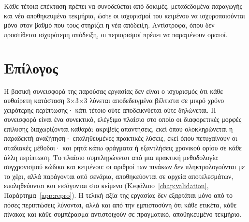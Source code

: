 Κάθε τέτοια επέκταση πρέπει να συνοδεύεται από δοκιμές, μεταδεδομένα παραγωγής και νέα αποθηκευμένα τεκμήρια, ώστε οι ισχυρισμοί του κειμένου να ισχυροποιούνται μόνο στον βαθμό που τους στηρίζει η νέα απόδειξη. Αντίστροφα, όπου δεν προστίθεται ισχυρότερη απόδειξη, οι περιορισμοί πρέπει να παραμένουν ορατοί.

\section{Επίλογος}
\label{sec:conclusions-epilogue}

Η βασική συνεισφορά της παρούσας εργασίας δεν είναι ο ισχυρισμός ότι κάθε αυθαίρετη κατάσταση 3×3×3 λύνεται αποδεδειγμένα βέλτιστα σε μικρό χρόνο χειρότερης περίπτωσης· κάτι τέτοιο ούτε αποδεικνύεται ούτε δηλώνεται. Η συνεισφορά είναι ένα συνεκτικό, ελέγξιμο πλαίσιο στο οποίο οι διαφορετικές μορφές επίλυσης διαχωρίζονται καθαρά: ακριβείς απαντήσεις, εκεί όπου ολοκληρώνεται η παραδεκτή αναζήτηση· επαληθευμένες πρακτικές λύσεις, εκεί όπου πετυχαίνουν οι σταδιακές μέθοδοι· και ρητά κάτω φράγματα ή εξαντλήσεις χρονικού ορίου σε κάθε άλλη περίπτωση. Το πλαίσιο συμπληρώνεται από μια πρακτική μεθοδολογία συγχρονισμού κώδικα και κειμένου: οι αριθμοί των πινάκων δεν πληκτρολογούνται με το χέρι, αλλά παράγονται από σενάρια, αποθηκεύονται σε αρχεία αποτελεσμάτων, επαληθεύονται και εισάγονται στο κείμενο (Κεφάλαιο~\ref{chap:validation}, Παράρτημα~\ref{app:repro}). Η τελική αξία της εργασίας δεν εξαρτάται μόνο από το πόσες περιπτώσεις λύνονται, αλλά και από την εμπιστοσύνη ότι κάθε ετικέτα, κάθε πίνακας και κάθε συμπέρασμα αντιστοιχούν σε πραγματικό, αποθηκευμένο τεκμήριο.
